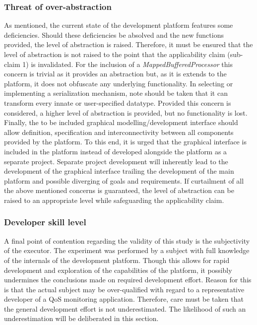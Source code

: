 \subsubsection{Threat of over-abstraction}
As mentioned, the current state of the development platform features some deficiencies. Should these deficiencies be absolved and the new functions provided, the level of abstraction is raised. Therefore, it must be ensured that the level of abstraction is not raised to the point that the applicability claim (sub-claim 1) is invalidated. For the inclusion of a \emph{MappedBufferedProcessor} this concern is trivial as it provides an abstraction but, as it is extends to the platform, it does not obfuscate any underlying functionality. In selecting or implementing a serialization mechanism, note should be taken that it can transform every innate or user-specified datatype. Provided this concern is considered, a higher level of abstraction is provided, but no functionality is lost. Finally, the to be included graphical modelling/development interface should allow definition, specification and interconnectivity between all components provided by the platform. To this end, it is urged that the graphical interface is included in the platform instead of developed alongside the platform as a separate project. Separate project development will inherently lead to the development of the graphical interface trailing the development of the main platform and possible diverging of goals and requirements. If curtailment of all the above mentioned concerns is guaranteed, the level of abstraction can be raised to an appropriate level while safeguarding the applicability claim.

\subsubsection{Developer skill level}
A final point of contention regarding the validity of this study is the subjectivity of the executor. The experiment was performed by a subject with full knowledge of the internals of the development platform. Though this allows for rapid development and exploration of the capabilities of the platform, it possibly undermines the conclusions made on required development effort. Reason for this is that the actual subject may be over-qualified with regard to a representative developer of a QoS monitoring application. Therefore, care must be taken that the general development effort is not underestimated. The likelihood of such an underestimation will be deliberated in this section.

